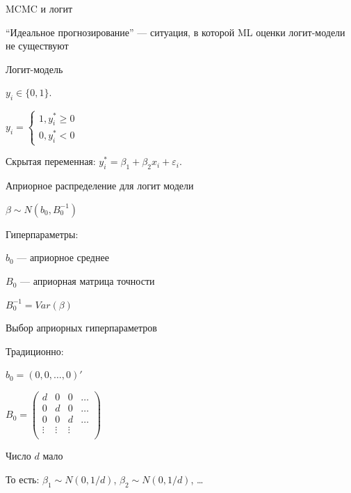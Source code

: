 \documentclass[ignorenonframetext,]{beamer}
\begin{document}
\begin{frame}{MCMC и логит}

``Идеальное прогнозирование'' --- ситуация, в которой ML оценки
логит-модели не существуют

\end{frame}

\begin{frame}{Логит-модель}

\(y_i \in \{0,1\}\).

\(y_i=\begin{cases} 1, y^*_i \geq 0 \\ 0, y^*_i <0 \end{cases}\)

Скрытая переменная: \(y^*_i=\beta_1 +\beta_2 x_i +\varepsilon_i\).

\end{frame}

\begin{frame}{Априорное распределение для логит модели}

\(\beta \sim N(b_0, B_0^{-1})\)

Гиперпараметры:

\(b_0\) --- априорное среднее

\(B_0\) --- априорная матрица точности

\(B_0^{-1}=Var(\beta)\)

\end{frame}

\begin{frame}{Выбор априорных гиперпараметров}

Традиционно:

\(b_0 = (0, 0, \ldots, 0)'\)

\(B_0 = \begin{pmatrix} d & 0 & 0 & \ldots \\ 0 & d & 0 & \ldots \\ 0 & 0 & d & \ldots \\ \vdots & \vdots & \vdots & \\ \end{pmatrix}\)

Число \(d\) мало

То есть: \(\beta_1 \sim N(0, 1/d)\), \(\beta_2 \sim N(0, 1/d)\),
\ldots{}

\end{frame}
\end{document}
